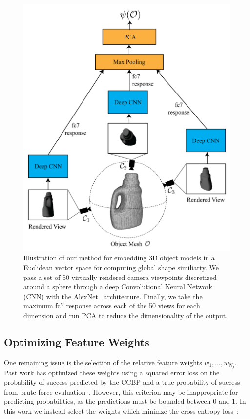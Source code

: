 \begin{figure}[t!]
\centering
\includegraphics[scale=0.3]{figures/illustrations/cnn_model.png}
\caption{Illustration of our method for embedding 3D object models in a Euclidean vector space for computing global shape similiarty. We pass a set of 50 virtually rendered camera viewpoints discretized around a sphere through a deep Convolutional Neural Network (CNN) with the AlexNet~\cite{krizhevsky2012imagenet} architecture. Finally, we take the maximum fc7 response across each of the 50 views for each dimension and run PCA to reduce the dimensionality of the output.}
\vspace*{-15pt}
\end{figure}

\subsection{Optimizing Feature Weights}
One remaining issue is the selection of the relative feature weights $w_1, ..., w_{N_f}$.
Past work has optimized these weights using a squared error loss on the probability of success predicted by the CCBP and a true probability of success from brute force evaluation~\cite{montesano2012active}.
However, this criterion may be inappropriate for predicting probabilities, as the predictions must be bounded between 0 and 1.
In this work we instead select the weights which minimze the cross entropy loss~\cite{}:

